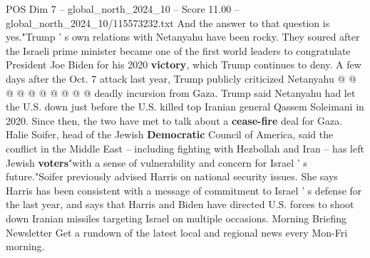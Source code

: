 \begin{textsample}{POS Dim 7 – global\_north\_2024\_10 – Score 11.00 – global\_north\_2024\_10/115573232.txt}
And the answer to that question is yes."Trump ' s own relations with Netanyahu have been rocky.
They soured after the Israeli prime minister became one of the first world leaders to congratulate President Joe Biden for his 2020 \textbf{victory}, which Trump continues to deny.
A few days after the Oct. 7 attack last year, Trump publicly criticized Netanyahu @ @ @ @ @ @ @ @ @ @ deadly incursion from Gaza.
Trump said Netanyahu had let the U.S. down just before the U.S. killed top Iranian general Qassem Soleimani in 2020.
Since then, the two have met to talk about a \textbf{cease-fire} deal for Gaza.
Halie Soifer, head of the Jewish \textbf{Democratic} Council of America, said the conflict in the Middle East -- including fighting with Hezbollah and Iran -- has left Jewish \textbf{voters}"with a sense of vulnerability and concern for Israel ' s future."Soifer previously advised Harris on national security issues.
She says Harris has been consistent with a message of commitment to Israel ' s defense for the last year, and says that Harris and Biden have directed U.S. forces to shoot down Iranian missiles targeting Israel on multiple occasions.
Morning Briefing Newsletter Get a rundown of the latest local and regional news every Mon-Fri morning.

\end{textsample}
